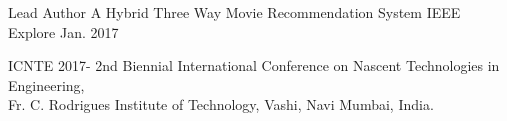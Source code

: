 


\begin{cventries}


\cventry
{Lead Author} %
{A Hybrid Three Way Movie Recommendation System} %
{IEEE Explore} %
{Jan. 2017} %
{ %
\begin{cvitems}
\item {ICNTE 2017- 2nd Biennial International Conference on Nascent Technologies in Engineering,
 \\ Fr. C. Rodrigues Institute of Technology, Vashi, Navi Mumbai, India.}
\end{cvitems}
}




\end{cventries}
\vspace{-1\baselineskip} 
